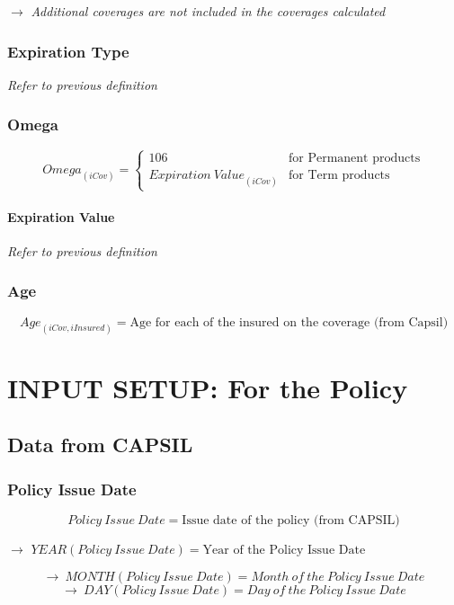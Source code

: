 \documentclass[10pt]{article}
\begin{document}
$\rightarrow$ \textit{Additional coverages are not included in the coverages calculated}

\subsubsection{Expiration Type}
\textit{Refer to previous definition}

\subsubsection{Omega}

\[
{Omega}_{\left(iCov\right)} = \begin{cases}
106 & \text{for Permanent products} \\
{Expiration\ Value}_{\left(iCov\right)} & \text{for Term products}
\end{cases}
\]

\paragraph{Expiration Value}
\textit{Refer to previous definition}

\subsubsection{Age}

\[
{Age}_{\left(iCov,iInsured\right)} = \text{Age for each of the insured on the coverage (from Capsil)}
\]

\section{INPUT SETUP: For the Policy}

\subsection{Data from CAPSIL}

\subsubsection{Policy Issue Date}

\[
{Policy\ Issue\ Date} = \text{Issue date of the policy (from CAPSIL)}
\]

$\rightarrow$ $YEAR\left({Policy\ Issue\ Date}\right) = \text{Year of the Policy Issue Date}$

\[
\rightarrow\ MONTH\left(Policy\ Issue\ Date\right) = Month\ of\ the\ Policy\ Issue\ Date
\]
\[
\rightarrow\ DAY\left(Policy\ Issue\ Date\right) = Day\ of\ the\ Policy\ Issue\ Date
\]
\end{document}
